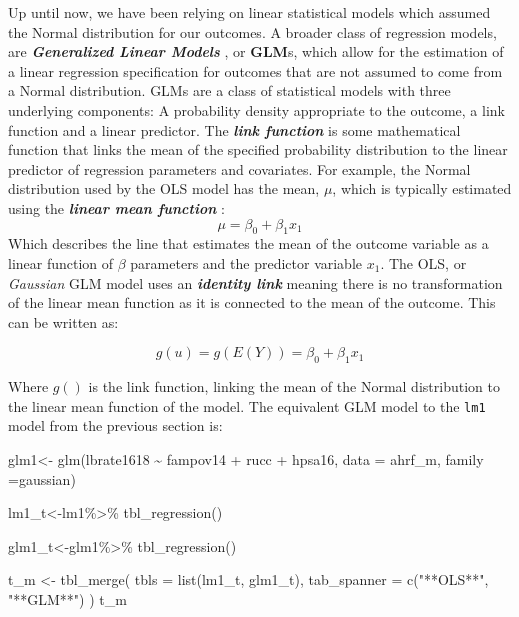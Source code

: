 \documentclass[
]{article}
\newenvironment{Shaded}{\begin{snugshade}}{\end{snugshade}}
\newcommand{\AttributeTok}[1]{\textcolor[rgb]{0.77,0.63,0.00}{#1}}
\newcommand{\FunctionTok}[1]{\textcolor[rgb]{0.00,0.00,0.00}{#1}}
\newcommand{\NormalTok}[1]{#1}
\newcommand{\OtherTok}[1]{\textcolor[rgb]{0.56,0.35,0.01}{#1}}
\newcommand{\SpecialCharTok}[1]{\textcolor[rgb]{0.00,0.00,0.00}{#1}}
\newcommand{\StringTok}[1]{\textcolor[rgb]{0.31,0.60,0.02}{#1}}
\begin{document}
Up until now, we have been relying on linear statistical models which assumed the Normal distribution for our outcomes. A broader class of regression models, are \textbf{\emph{Generalized Linear Models}} \citep{nelder_generalized_1972, mccullagh_generalized_1998}, or \textbf{GLM}s, which allow for the estimation of a linear regression specification for outcomes that are not assumed to come from a Normal distribution. GLMs are a class of statistical models with three underlying components: A probability density appropriate to the outcome, a link function and a linear predictor. The \textbf{\emph{link function}} is some mathematical function that links the mean of the specified probability distribution to the linear predictor of regression parameters and covariates. For example, the Normal distribution used by the OLS model has the mean, \(\mu\), which is typically estimated using the \textbf{\emph{linear mean function}} :
\[\mu = \beta_0 + \beta_1 x_1\]
Which describes the line that estimates the mean of the outcome variable as a linear function of \(\beta\) parameters and the predictor variable \(x_1\). The OLS, or \emph{Gaussian} GLM model uses an \textbf{\emph{identity link}} meaning there is no transformation of the linear mean function as it is connected to the mean of the outcome. This can be written as:

\[g(u) = g(E(Y)) = \beta_0 + \beta_1 x_1\]

Where \(g()\) is the link function, linking the mean of the Normal distribution to the linear mean function of the model. The equivalent GLM model to the \texttt{lm1} model from the previous section is:

\begin{Shaded}
\begin{Highlighting}[]
\NormalTok{glm1}\OtherTok{\textless{}{-}} \FunctionTok{glm}\NormalTok{(lbrate1618 }\SpecialCharTok{\textasciitilde{}}\NormalTok{  fampov14 }\SpecialCharTok{+}\NormalTok{ rucc }\SpecialCharTok{+}\NormalTok{ hpsa16,}
          \AttributeTok{data =}\NormalTok{ ahrf\_m, }
          \AttributeTok{family =}\NormalTok{gaussian)}

\NormalTok{lm1\_t}\OtherTok{\textless{}{-}}\NormalTok{lm1}\SpecialCharTok{\%\textgreater{}\%}
  \FunctionTok{tbl\_regression}\NormalTok{()}


\NormalTok{glm1\_t}\OtherTok{\textless{}{-}}\NormalTok{glm1}\SpecialCharTok{\%\textgreater{}\%}
  \FunctionTok{tbl\_regression}\NormalTok{()}

\NormalTok{t\_m }\OtherTok{\textless{}{-}} \FunctionTok{tbl\_merge}\NormalTok{(}
    \AttributeTok{tbls =} \FunctionTok{list}\NormalTok{(lm1\_t, glm1\_t),}
    \AttributeTok{tab\_spanner =} \FunctionTok{c}\NormalTok{(}\StringTok{"**OLS**"}\NormalTok{, }\StringTok{"**GLM**"}\NormalTok{)}
\NormalTok{  )}
\NormalTok{t\_m}
\end{Highlighting}
\end{Shaded}
\end{document}
